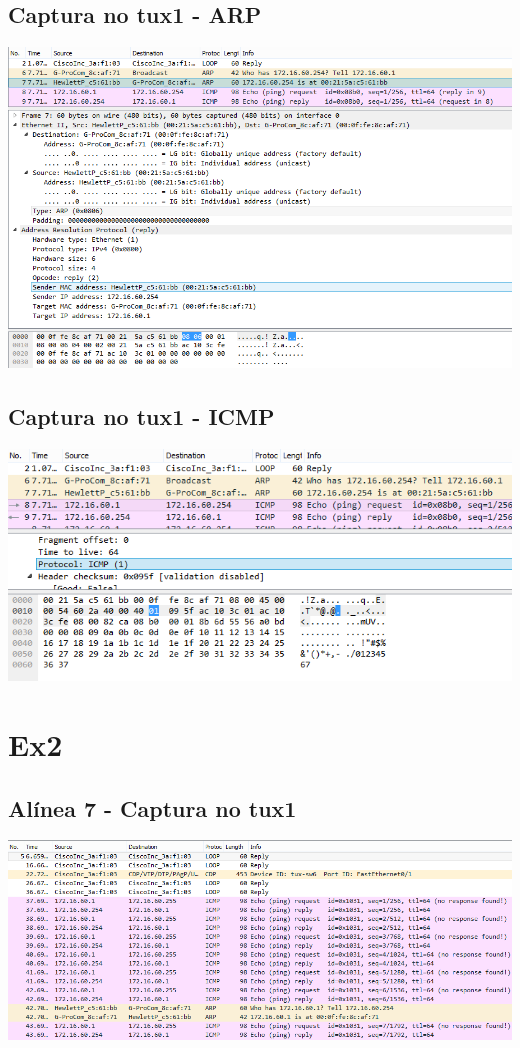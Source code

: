 \documentclass[11pt,a4paper,reqno]{report}
\numberwithin{equation}{section}
\begin{document}
\begin{appendices}
\subsection{Captura no tux1 - ARP}
\includegraphics[width=18cm]{ex1_arp.png}
\subsection{Captura no tux1 - ICMP}
\includegraphics[width=18cm]{ex1_icmp.png}

\section{Ex2}%
\label{ex_2}
\subsection{Alínea 7 - Captura no tux1}
\includegraphics[width=18cm]{ex2_a7_tux1.png}

\end{appendices}
\end{document}
